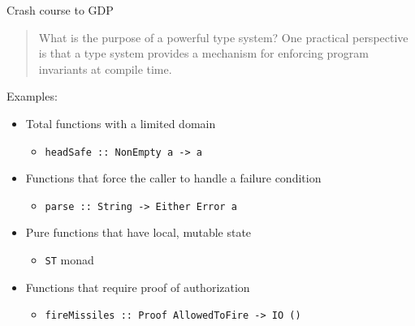 \documentclass[
  9pt,
  ignorenonframetext,
]{beamer}
\providecommand{\tightlist}{%
  \setlength{\itemsep}{0pt}\setlength{\parskip}{0pt}}
\begin{document}
\begin{frame}[fragile]{Crash course to GDP}
\protect\hypertarget{crash-course-to-gdp-2}{}
\begin{quote}
What is the purpose of a powerful type system? One practical perspective
is that a type system provides a mechanism for enforcing program
invariants at compile time.
\end{quote}

Examples:

\begin{itemize}
\tightlist
\item
  Total functions with a limited domain

  \begin{itemize}
  \tightlist
  \item
    \texttt{headSafe\ ::\ NonEmpty\ a\ -\textgreater{}\ a}
  \end{itemize}
\item
  Functions that force the caller to handle a failure condition

  \begin{itemize}
  \tightlist
  \item
    \texttt{parse\ ::\ String\ -\textgreater{}\ Either\ Error\ a}
  \end{itemize}
\item
  Pure functions that have local, mutable state

  \begin{itemize}
  \tightlist
  \item
    \texttt{ST} monad
  \end{itemize}
\item
  Functions that require proof of authorization

  \begin{itemize}
  \tightlist
  \item
    \texttt{fireMissiles\ ::\ Proof\ AllowedToFire\ -\textgreater{}\ IO\ ()}
  \end{itemize}
\end{itemize}











\end{frame}
\end{document}
